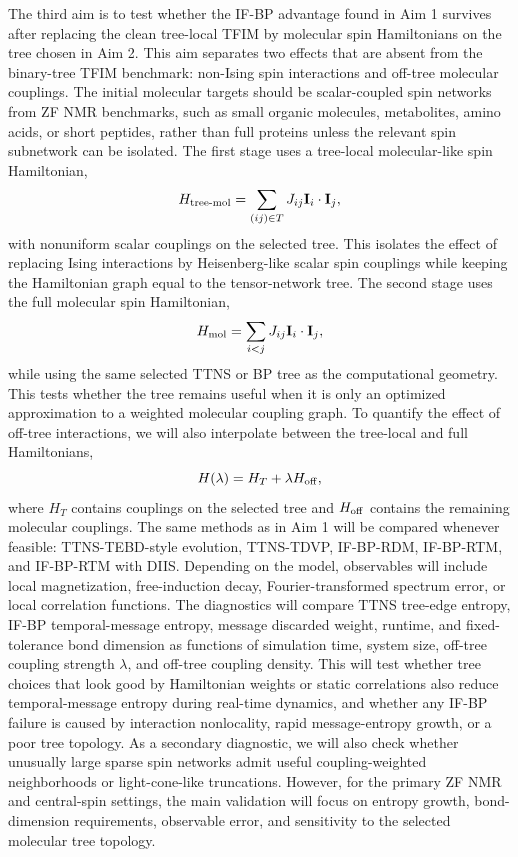 \documentclass[12pt]{article}
\begin{document}
The third aim is to test whether the IF-BP advantage found in Aim 1 survives after replacing the clean tree-local TFIM by molecular spin Hamiltonians on the tree chosen in Aim 2.
This aim separates two effects that are absent from the binary-tree TFIM benchmark: non-Ising spin interactions and off-tree molecular couplings.
The initial molecular targets should be scalar-coupled spin networks from ZF NMR benchmarks, such as small organic molecules, metabolites, amino acids, or short peptides, rather than full proteins unless the relevant spin subnetwork can be isolated.
The first stage uses a tree-local molecular-like spin Hamiltonian,
\begin{equation}
H_{\rm tree\text{-}mol}=\sum_{(ij)\in T}J_{ij}\mathbf I_i\cdot\mathbf I_j,
\end{equation}
with nonuniform scalar couplings on the selected tree.
This isolates the effect of replacing Ising interactions by Heisenberg-like scalar spin couplings while keeping the Hamiltonian graph equal to the tensor-network tree.
The second stage uses the full molecular spin Hamiltonian,
\begin{equation}
H_{\rm mol}=\sum_{i<j}J_{ij}\mathbf I_i\cdot\mathbf I_j,
\end{equation}
while using the same selected TTNS or BP tree as the computational geometry.
This tests whether the tree remains useful when it is only an optimized approximation to a weighted molecular coupling graph.
To quantify the effect of off-tree interactions, we will also interpolate between the tree-local and full Hamiltonians,
\begin{equation}
H(\lambda)=H_T+\lambda H_{\rm off},
\end{equation}
where \(H_T\) contains couplings on the selected tree and \(H_{\rm off}\) contains the remaining molecular couplings.
The same methods as in Aim 1 will be compared whenever feasible: TTNS-TEBD-style evolution, TTNS-TDVP, IF-BP-RDM, IF-BP-RTM, and IF-BP-RTM with DIIS.
Depending on the model, observables will include local magnetization, free-induction decay, Fourier-transformed spectrum error, or local correlation functions.
The diagnostics will compare TTNS tree-edge entropy, IF-BP temporal-message entropy, message discarded weight, runtime, and fixed-tolerance bond dimension as functions of simulation time, system size, off-tree coupling strength \(\lambda\), and off-tree coupling density.
This will test whether tree choices that look good by Hamiltonian weights or static correlations also reduce temporal-message entropy during real-time dynamics, and whether any IF-BP failure is caused by interaction nonlocality, rapid message-entropy growth, or a poor tree topology.
As a secondary diagnostic, we will also check whether unusually large sparse spin networks admit useful coupling-weighted neighborhoods or light-cone-like truncations.
However, for the primary ZF NMR and central-spin settings, the main validation will focus on entropy growth, bond-dimension requirements, observable error, and sensitivity to the selected molecular tree topology.



\begin{singlespace}
\printbibliography
\end{singlespace}
\end{document}
